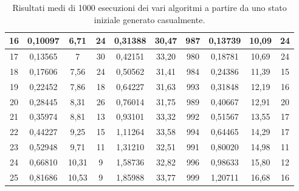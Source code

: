 \begin{table}[]
{\begin{tabular}{|c|c|c|c|c|c|c|c|c|c|}
16 & 0,10097    & 6,71   & 24           & 0,31388        & 30,47     & 987            & 0,13739        & 10,09      & 24              \\ \hline
17 & 0,13565    & 7      & 30           & 0,42151        & 33,20     & 980            & 0,18781        & 10,69      & 24              \\ \hline
18 & 0,17606    & 7,56   & 24           & 0,50562        & 31,41     & 984            & 0,24386        & 11,39      & 15              \\ \hline
19 & 0,22452    & 7,86   & 18           & 0,64227        & 31,63     & 993            & 0,31848        & 12,19      & 16              \\ \hline
20 & 0,28445    & 8,31   & 26           & 0,76014        & 31,75     & 989            & 0,40667        & 12,91      & 20              \\ \hline
21 & 0,35974    & 8,81   & 13           & 0,93101        & 33,32     & 992            & 0,51567        & 13,55      & 17              \\ \hline
22 & 0,44227    & 9,25   & 15           & 1,11264        & 33,58     & 994            & 0,64465        & 14,29      & 17              \\ \hline
23 & 0,52948    & 9,71   & 11           & 1,31210        & 32,51     & 991            & 0,80020        & 14,98      & 11              \\ \hline
24 & 0,66810    & 10,31  & 9            & 1,58736        & 32,82     & 996            & 0,98633        & 15,80      & 12              \\ \hline
25 & 0,81686    & 10,53  & 9            & 1,85988        & 33,77     & 999            & 1,20711        & 16,68      & 16              \\ \hline
\end{tabular}
}
\caption{Risultati medi di 1000 esecuzioni dei vari algoritmi a partire da uno stato iniziale generato casualmente.}
\label{table:allrandom}
\end{table}